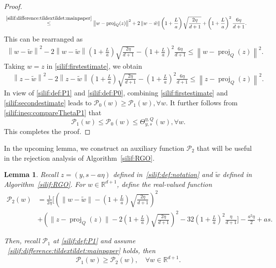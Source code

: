 \documentclass[11pt,letterpaper]{article}
\newcommand{\R}{\mathbb{R}}
\newcommand{\norm}[1]{\left\lVert #1 \right\rVert}
\newcommand{\proj}{\operatorname{proj}}
\newcommand{\brac}[1]{\left( #1\right)}
\newtheorem{lemma}[thm]{Lemma}
\begin{document}
\begin{proof}
\begin{align*}
        &\stackrel{\eqref{silif:difference:tildextildet:mainpaper}}{\leq} \norm{w-\proj_Q(z)}^2+2\norm{w-\tilde{w}}\brac{1+\frac{L}{a}}\sqrt{\frac{2\eta}{d+1}}+\brac{1+\frac{L}{a}}^2\frac{6\eta}{d+1}. 
    \end{align*}
This can be rearranged as 
\begin{align}
\label{silif:firstestimate}
    \norm{w-\tilde{w}}^2-2\norm{w-\tilde{w}}\brac{1+\frac{L}{a}}\sqrt{\frac{2\eta}{d+1}}-\brac{1+\frac{L}{a}}^2\frac{6\eta}{d+1}\leq \norm{w-\proj_Q(z)}^2. 
\end{align}
Taking $w=z$ in \eqref{silif:firstestimate}, we obtain
\begin{align}
    \label{silif:secondestimate}
      &\norm{z-\tilde{w}}^2-2\norm{z-\tilde{w}}\brac{1+\frac{L}{a}}\sqrt{\frac{2\eta}{d+1}}-\brac{1+\frac{L}{a}}^2\frac{6\eta}{d+1}\leq \norm{z-\proj_Q(z)}^2. 
\end{align}
In view of \eqref{silif:def:P1} and \eqref{silif:def:P0}, combining \eqref{silif:firstestimate} and \eqref{silif:secondestimate} leads to $\mathcal{P}_0(w)\geq \mathcal{P}_1(w),\forall w$. 
It further follows from \eqref{silif:ineq:compareThetaP1} that
\[
    \mathcal{P}_1(w)\leq \mathcal{P}_0(w)\leq \Theta_{y,s}^{\eta,Q}(w), \forall w. 
\]
This completes the proof. 
\end{proof}


In the upcoming lemma, we construct an auxiliary function  $\mathcal{P}_2$ that will be useful in the rejection analysis of Algorithm~\ref{silif:RGO}. 
\begin{lemma}
\label{silif:lem:compareP1P2}  
 Recall $z=(y,s-a\eta)$ defined in~\eqref{silif:def:notation} and $\tilde{w}$ defined in Algorithm~\ref{silif:RGO}. For $w\in \R^{d+1}$, define the real-valued function 
\begin{align}
\label{silif:def:P2}
\mathcal{P}_2(w)
&= \frac{1}{2\eta}\Bigg[
\left(\|w-\tilde{w}\| - \left(1+\frac{L}{a}\right)\sqrt{\frac{2\eta}{d+1}}\right)^2 \nonumber\\
&
+ \left(\|z-\operatorname{proj}_Q(z)\| - 2\left(1+\frac{L}{a}\right)\sqrt{\frac{2\eta}{d+1}}\right)^2
- 32\left(1+\frac{L}{a}\right)^2\frac{\eta}{d+1}
\Bigg] -\frac{a^2\eta}{2} + a s.
\end{align}



Then, recall $\mathcal{P}_1$ at \eqref{silif:def:P1} and assume ~\eqref{silif:difference:tildextildet:mainpaper} holds, then
\begin{equation}\label{silif:ineq:P2-P3}
    \mathcal{P}_1(w)\geq \mathcal{P}_2(w), \quad \forall w\in \R^{d+1}.
\end{equation}
\end{lemma}
\end{document}
